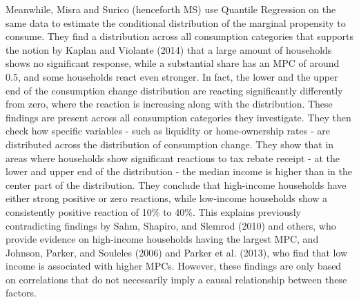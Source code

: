 Meanwhile, Misra and Surico (henceforth MS) use Quantile Regression on the same data to estimate the conditional distribution of the marginal propensity to consume. They find a distribution across all consumption categories that supports the notion by Kaplan and Violante (2014) that a large amount of households shows no significant response, while a substantial share has an MPC of around 0.5, and some households react even stronger. In fact, the lower and the upper end of the consumption change distribution are reacting significantly differently from zero, where the reaction is increasing along with the distribution. These findings are present across all consumption categories they investigate. They then check how specific variables - such as liquidity or home-ownership rates - are distributed across the distribution of consumption change. They show that in areas where households show significant reactions to tax rebate receipt - at the lower and upper end of the distribution - the median income is higher than in the center part of the distribution. They conclude that high-income households have either strong positive or zero reactions, while low-income households show a consistently positive reaction of 10\% to 40\%. This explains previously contradicting findings by Sahm, Shapiro, and Slemrod (2010) and others, who provide evidence on high-income households having the largest MPC, and Johnson, Parker, and Souleles (2006) and Parker et al. (2013), who find that low income is associated with higher MPCs. However, these findings are only based on correlations that do not necessarily imply a causal relationship between these factors. \\ 
